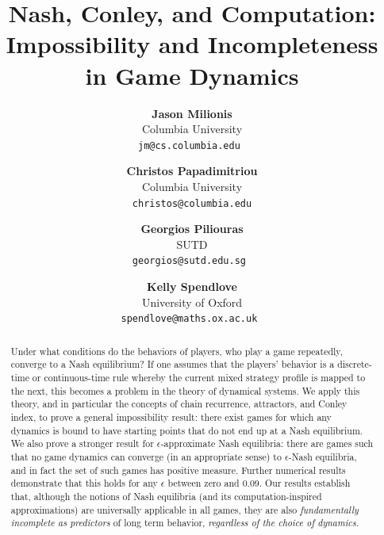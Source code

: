 \documentclass[11pt]{article}
\begin{document}
\title{Nash, Conley, and Computation:\\ Impossibility and Incompleteness in Game Dynamics}

\author{
	    \textbf{Jason Milionis} \\
		\small Columbia University\\
		\small \tt{jm@cs.columbia.edu}
		\and
		\textbf{Christos Papadimitriou} \\
		\small Columbia University\\
		\small \tt{christos@columbia.edu}\\
		\and
		\textbf{Georgios Piliouras} \\
		\small SUTD\\
		\small \tt{georgios@sutd.edu.sg}
		\and
		\textbf{Kelly Spendlove}\\
		\small University of Oxford\\
		\small \tt{spendlove@maths.ox.ac.uk}
}
\date{}
\maketitle

\thispagestyle{empty}

\begin{abstract}
Under what conditions do the behaviors of players, who play a game repeatedly, converge to a Nash equilibrium? If one assumes that the players' behavior is a discrete-time or continuous-time rule whereby the current mixed strategy profile is mapped to the next, this becomes a problem in the theory of dynamical systems.
We apply this theory, and in particular the concepts of chain recurrence, attractors, and Conley index, to prove a general impossibility result: there exist games for which any dynamics is bound to have starting points that do not end up at a Nash equilibrium.
We also prove a stronger result for $\epsilon$-approximate Nash equilibria: there are games such that no game dynamics can converge (in an appropriate sense) to $\epsilon$-Nash equilibria, and in fact the set of such games has positive measure. Further numerical results demonstrate that this holds for any $\epsilon$ between zero and $0.09$.
Our results establish that, although the notions of Nash equilibria (and its computation-inspired approximations) are universally applicable in all games, they are also \textit{fundamentally incomplete as predictors} of long term behavior, \textit{regardless of the choice of  dynamics}.
\end{abstract}
\end{document}
